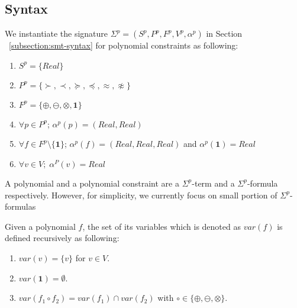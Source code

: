 \subsection{Syntax}
We instantiate the signature $\Sigma^p = (S^p, P^p, F^p, V^p, \alpha^p)$ in Section ~\ref{subsection:smt-syntax} for polynomial constraints as following:
\begin{enumerate}
\item $S^p = \{Real\}$
\item $P^p = \{\succ, \prec, \succeq, \preceq, \approx, \not\approx\}$
\item $F^p = \{\oplus, \ominus, \otimes, \mathbf{1}\}$
\item $\forall p \in P^p$; $\alpha^p(p) = (Real, Real)$
\item $\forall f \in F^p\setminus \{\mathbf{1}\}$; $\alpha^p(f) = (Real, Real, Real)$ and $\alpha^p(\mathbf{1})=Real$
\item $\forall v \in V; \; \alpha^P(v) = Real$
\end{enumerate}
A polynomial and a polynomial constraint are a $\Sigma^p$-term and a $\Sigma^p$-formula respectively. However, for simplicity, we currently focus on small portion of $\Sigma^p$-formulas

\begin{definition}
Given a polynomial $f$, the set of its variables which is denoted as $var(f)$ is defined recursively as following:
\begin{enumerate}
\item $var(v) = \{v\}$ for $v \in V$.
\item $var(\mathbf{1}) = \emptyset$.
\item $var(f_1 \circ f_2) = var(f_1) \cap var(f_2)$ with $\circ \in \{\oplus, \ominus, \otimes\}$.
\end{enumerate}
\end{definition}

